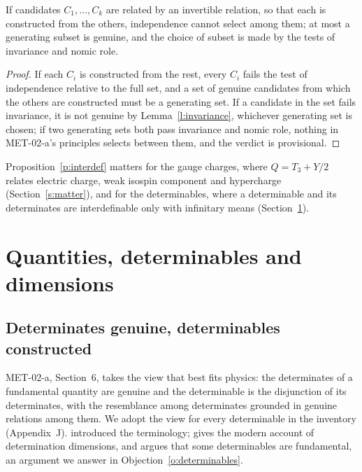 \documentclass{situationist-preprint}
\begin{document}
\begin{proposition}[Interdefinability]\label{p:interdef}
If candidates $C_1, \dots, C_k$ are related by an invertible relation, so that each is constructed from the others, independence cannot select among them; at most a generating subset is genuine, and the choice of subset is made by the tests of invariance and nomic role.
\end{proposition}

\begin{proof}
If each $C_i$ is constructed from the rest, every $C_i$ fails the test of independence relative to the full set, and a set of genuine candidates from which the others are constructed must be a generating set. If a candidate in the set fails invariance, it is not genuine by Lemma~\ref{l:invariance}, whichever generating set is chosen; if two generating sets both pass invariance and nomic role, nothing in MET-02-a's principles selects between them, and the verdict is provisional.
\end{proof}

Proposition~\ref{p:interdef} matters for the gauge charges, where $Q = T_3 + Y/2$ relates electric charge, weak isospin component and hypercharge (Section~\ref{s:matter}), and for the determinables, where a determinable and its determinates are interdefinable only with infinitary means (Section~\ref{s:quantities}).

\section{Quantities, determinables and dimensions}\label{s:quantities}

\subsection{Determinates genuine, determinables constructed}

MET-02-a, Section~6, takes the view that best fits physics: the determinates of a fundamental quantity are genuine and the determinable is the disjunction of its determinates, with the resemblance among determinates grounded in genuine relations among them. We adopt the view for every determinable in the inventory (Appendix~J). \citet{Johnson1921} introduced the terminology; \citet{Funkhouser2006} gives the modern account of determination dimensions, and \citet{Wilson2012} argues that some determinables are fundamental, an argument we answer in Objection~\ref{o:determinables}.
\end{document}
